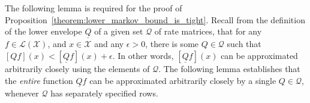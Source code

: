 \documentclass[10pt,a4paper]{paper}
\theoremstyle{definition}
\newcommand{\reals}{\mathbb{R}}
\newcommand{\realspos}{\reals_{>0}}
\newcommand{\states}{\mathcal{X}}
\newcommand{\gambles}{\mathcal{L}}
\newcommand{\gamblesX}{\gambles(\states)}
\newcommand{\rateset}{\mathcal{Q}}
\newcommand{\lrate}{\underline{Q}}
\begin{document}
%
%

The following lemma is required for the proof of Proposition~\ref{theorem:lower_markov_bound_is_tight}. Recall from the definition of the lower envelope $\lrate$ of a given set $\rateset$ of rate matrices, that for any $f\in\gamblesX$, and $x\in\states$ and any $\epsilon>0$, there is some $Q\in\rateset$ such that $[Qf](x)<[\lrate f](x)+\epsilon$. In other words, $[\lrate f](x)$ can be approximated arbitrarily closely using the elements of $\rateset$. The following lemma establishes that the \emph{entire} function $\lrate f$ can be approximated arbitrarily closely by a single $Q\in\rateset$, whenever $\rateset$ has separately specified rows.
\end{document}
